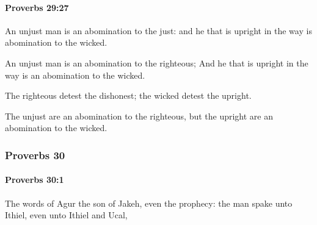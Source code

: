 		\paragraph{Proverbs 29:27} %
			\label{PROVERBS-29-27}

			An unjust man is an abomination to the just: and he that is upright in the way is abomination to the wicked.

			\begin{versebox}
					\item[BHS] 
					\item[ASV] An unjust man is an abomination to the righteous; And he that is upright in the way is an abomination to the wicked.
					\item[NIV] The righteous detest the dishonest; the wicked detest the upright.
					\item[NRSV] The unjust are an abomination to the righteous, but the upright are an abomination to the wicked.
			\end{versebox}
	\subsubsection{Proverbs 30} %
		\label{PROVERBS-30}

		\paragraph{Proverbs 30:1} %
			\label{PROVERBS-30-1}

			The words of Agur the son of Jakeh, even the prophecy: the man spake unto Ithiel, even unto Ithiel and Ucal,

